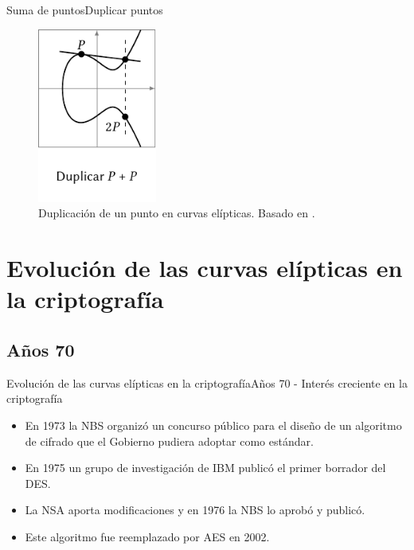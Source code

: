 \documentclass[spanish]{beamer}
\begin{document}
\begin{frame}{Suma de puntos}{Duplicar puntos}
  \begin{figure}[h]
    \centering
    \includegraphics[width=0.35\textwidth]{img/duplicar-curvas}
    \caption{Duplicación de un punto en curvas elípticas. Basado en  \parencite{eichlseder_elliptic_2016}.}
    \label{fig:duplicar-curvas}
  \end{figure}
\end{frame}

\section{Evolución de las curvas elípticas en la criptografía}
\subsection{Años 70}
\begin{frame}[fragile]{Evolución de las curvas elípticas en la criptografía}{Años 70 - Interés creciente en la criptografía}
  \begin{itemize}
    \item En 1973 la NBS organizó un concurso público para el diseño de un algoritmo de cifrado que el Gobierno pudiera adoptar como estándar.
    \item En 1975 un grupo de investigación de IBM publicó el primer borrador del DES.
    \item La NSA aporta modificaciones y en 1976 la NBS lo aprobó y publicó. %
    \item Este algoritmo fue reemplazado por AES en 2002.
  \end{itemize}
\end{frame}
\end{document}
